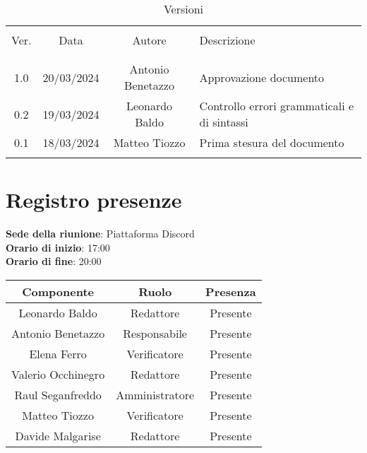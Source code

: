 \documentclass[italian,12pt]{article} %
\begin{document}


\newpage





\begin{table}[!h]
	\caption{Versioni}
	\begin{center}
		\begin{tabular}{ c c c p{9cm}}
			\hline \\[-2ex]
			Ver. & Data & Autore & Descrizione \\
			\\[-2ex] \hline \\[-1.5ex]
			1.0 & 20/03/2024 & Antonio Benetazzo & Approvazione documento \\
			0.2 & 19/03/2024 & Leonardo Baldo & Controllo errori grammaticali e di sintassi \\
			0.1 & 18/03/2024 & Matteo Tiozzo & Prima stesura del documento \\
			\\[-1.5ex] \hline
		\end{tabular}
	\end{center}
\end{table}
\newpage

\tableofcontents

\newpage

\section{Registro presenze}


\textbf{Sede della riunione}: Piattaforma Discord\\
\textbf{Orario di inizio}: 17:00\\
\textbf{Orario di fine}: 20:00\\

\begin{flushleft}
\begin{table}[!h]
\begin{tabular}{ |c|c|c| }
	\hline
	\textbf{Componente} & \textbf{Ruolo} & \textbf{Presenza} \\
	\hline
	Leonardo Baldo 		& Redattore & Presente \\
	Antonio Benetazzo 	& Responsabile & Presente \\
	Elena Ferro 		& Verificatore & Presente \\
	Valerio Occhinegro 	& Redattore & Presente \\
	Raul Seganfreddo 	& Amministratore & Presente \\
	Matteo Tiozzo 		& Verificatore & Presente \\
	Davide Malgarise 	& Redattore & Presente \\
	\hline
\end{tabular}
\end{table}
\end{flushleft}
\end{document}
